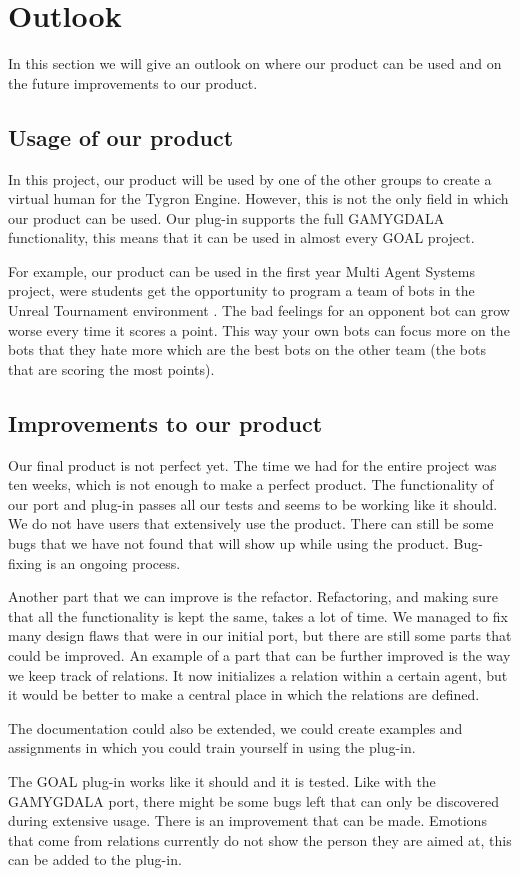 \section{Outlook}
In this section we will give an outlook on where our product can be used and on the future improvements to our product.

\subsection{Usage of our product}
In this project, our product will be used by one of the other groups to create a virtual human for the Tygron Engine. However, this is not the only field in which our product can be used. Our plug-in supports the full GAMYGDALA functionality, this means that it can be used in almost every GOAL project. \par
For example, our product can be used in the first year Multi Agent Systems project, were students get the opportunity to program a team of bots in the Unreal Tournament environment \citep{UT}. The bad feelings for an opponent bot can grow worse every time it scores a point. This way your own bots can focus more on the bots that they hate more which are the best bots on the other team (the bots that are scoring the most points).

\subsection{Improvements to our product}
Our final product is not perfect yet. The time we had for the entire project was ten weeks, which is not enough to make a perfect product. The functionality of our port and plug-in passes all our tests and seems to be working like it should. We do not have users that extensively use the product. There can still be some bugs that we have not found that will show up while using the product. Bug-fixing is an ongoing process. \par
Another part that we can improve is the refactor. Refactoring, and making sure that all the functionality is kept the same, takes a lot of time. We managed to fix many design flaws that were in our initial port, but there are still some parts that could be improved. An example of a part that can be further improved is the way we keep track of relations. It now initializes a relation within a certain agent, but it would be better to make a central place in which the relations are defined. \par
The documentation could also be extended, we could create examples and assignments in which you could train yourself in using the plug-in. \par
The GOAL plug-in works like it should and it is tested. Like with the GAMYGDALA port, there might be some bugs left that can only be discovered during extensive usage. There is an improvement that can be made. Emotions that come from relations currently do not show the person they are aimed at, this can be added to the plug-in.